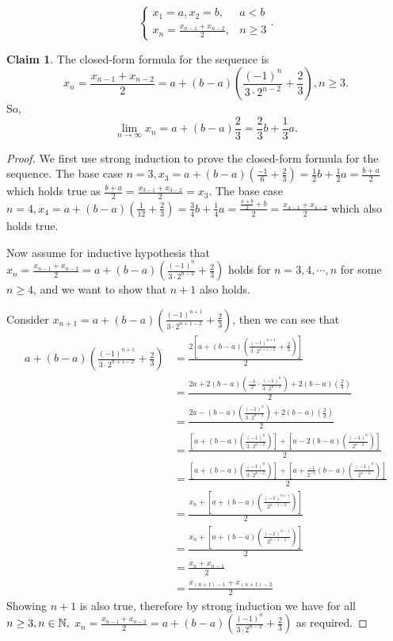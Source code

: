\documentclass{homework}
\newcommand{\N}{\bb{N}} %
\newcommand{\ra}{\rightarrow}
\newcommand{\?}{\stackrel{?}{=}}
\theoremstyle{definition}
\newtheorem*{claim}{Claim}
\begin{document}
\question[1] \[
\begin{cases}
    x_1=a,x_2=b, &a<b\\
    x_n=\frac{x_{n-1}+x_{n-2}}{2}, &n\geq3
\end{cases}.
\]
\begin{claim}
    The closed-form formula for the sequence is $$x_n=\frac{x_{n-1}+x_{n-2}}{2}=a+(b-a)\left(\frac{(-1)^n}{3\cdot2^{n-2}} + \frac23\right), n\geq3.$$ So, \[\lim_{n\ra\infty}x_n=a+(b-a)\frac23=\frac23b+\frac13a.\]
\end{claim}
\begin{proof}
    We first use strong induction to prove the closed-form formula for the sequence. The base case $n=3, x_3=a+(b-a)(\frac{-1}{6}+\frac23)=\frac12b+\frac12a=\frac{b+a}{2}$ which holds true as $\frac{b+a}{2}=\frac{x_{3-1}+x_{3-2}}{2}=x_3$. The base case $n=4, x_4=a+(b-a)(\frac1{12}+\frac23)=\frac34b+\frac14a=\frac{\frac{a+b}{2}+b}{2}=\frac{x_{4-1}+x_{4-2}}{2}$ which also holds true. 

    Now assume for inductive hypothesis that $x_n=\frac{x_{n-1}+x_{n-2}}{2}=a+(b-a)\left(\frac{(-1)^n}{3\cdot 2^{n-2}}+\frac23\right)$ holds for $n=3,4,\cdots,n$ for some $n\geq4$, and we want to show that $n+1$ also holds.

    Consider $x_{n+1}=a+(b-a)\left(\frac{(-1)^{n+1}}{3\cdot2^{n+1-2}}+\frac23\right)$, then we can see that \begin{align*}
        a+(b-a)\left(\frac{(-1)^{n+1}}{3\cdot2^{n+1-2}}+\frac23\right) &= \frac{2\left[a+(b-a)\left(\frac{(-1)^{n+1}}{3\cdot2^{n+1-2}}+\frac23\right)\right]}{2}\\
        &= \frac{2a + 2(b-a)\left(\frac{-1}{2}\cdot\frac{(-1)^n}{3\cdot2^{n-2}}\right) + 2(b-a)(\frac23)}{2}\\
        &= \frac{2a - (b-a)\left(\frac{(-1)^n}{3\cdot2^{n-2}}\right) + 2(b-a)(\frac23)}{2}\\
        &= \frac{\left[a + (b-a)\left(\frac{(-1)^n}{3\cdot 2^{n-2}}\right)\right]+\left[a - 2(b-a)\left(\frac{(-1)^n}{2^{n-2}}\right)\right]}{2}\\
        &= \frac{\left[a + (b-a)\left(\frac{(-1)^n}{3\cdot 2^{n-2}}\right)\right]+\left[a + \frac{-1}{2^{-1}}(b-a)\left(\frac{(-1)^n}{2^{n-2}}\right)\right]}{2}\\
        &= \frac{x_n+\left[a + (b-a)\left(\frac{(-1)^{n+1}}{2^{n-1-2}}\right)\right]}{2}\\
        &= \frac{x_n+\left[a + (b-a)\left(\frac{(-1)^{n-1}}{2^{n-1-2}}\right)\right]}{2}\\
        &=\frac{x_n+x_{n-1}}{2}\\
        &=\frac{x_{(n+1)-1}+x_{(n+1)-2}}{2}
    \end{align*}
    Showing $n+1$ is also true, therefore by strong induction we have for all $n\geq 3, n\in\N,$ $x_n=\frac{x_{n-1}+x_{n-2}}{2}=a+(b-a)\left(\frac{(-1)^n}{3\cdot2^{n-2}}+\frac23\right)$ as required.


\end{proof}
\end{document}
